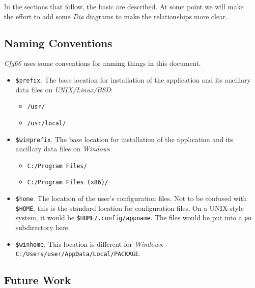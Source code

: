 \documentclass[
 11pt,
 twoside,
 a4paper,
 final                                 %
]{article}
\begin{document}
   In the sections that follow, the basic are described.
   At some point we will make the effort to add some \textsl{Dia}
   diagrams to make the relationships more clear.

\subsection{Naming Conventions}
\label{subsec:introduction_conventions}

   \textsl{Cfg66} uses some conventions for naming things in this
   document.

   \begin{itemize}
      \item \texttt{\$prefix}. The base location for installation of
         the application and its ancillary data files on
         \textsl{UNIX/Linux/BSD}:
         \begin{itemize}
            \item \texttt{/usr/}
            \item \texttt{/usr/local/}
         \end{itemize}
      \item \texttt{\$winprefix}. The base location for installation of
         the application and its ancillary data files on \textsl{Windows}.
         \begin{itemize}
            \item \texttt{C:/Program Files/}
            \item \texttt{C:/Program Files (x86)/}
         \end{itemize}
      \item \texttt{\$home}. The location of the user's configuration files.
         Not to be confused with \texttt{\$HOME}, this is
         the standard location for configuration files.
         On a UNIX-style system, it would be \linebreak
         \texttt{\$HOME/.config/appname}.
         The files would be put into a \texttt{po} subdirectory here.
      \item \texttt{\$winhome}. This location is different for
         \textsl{Windows}:
         \texttt{C:/Users/user/AppData/Local/PACKAGE}.
   \end{itemize}

\subsection{Future Work}
\label{subsec:introduction_future}
\end{document}
